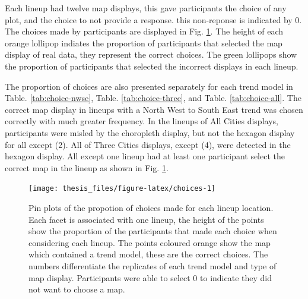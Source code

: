 \documentclass{monashthesis}
\begin{document}
Each lineup had twelve map displays, this gave participants the choice of any plot, and the choice to not provide a response. this non-reponse is indicated by 0.
The choices made by participants are displayed in Fig. \ref{fig:choices}. The height of each orange lollipop indiates the proportion of participants that selected the map display of real data, they represent the correct choices.
The green lollipops show the proportion of participants that selected the incorrect displays in each lineup.

The proportion of choices are also presented separately for each trend model in Table. \ref{tab:choice-nwse}, Table. \ref{tab:choice-three}, and Table. \ref{tab:choice-all}.
The correct map display in lineups with a North West to South East trend was chosen correctly with much greater frequency.
In the lineups of All Cities displays, participants were misled by the choropleth display, but not the hexagon display for all except (2).
All of Three Cities displays, except (4), were detected in the hexagon display. All except one lineup had at least one participant select the correct map in the lineup as shown in Fig. \ref{fig:choices}.

\begin{figure}

{\centering \texttt{[image: thesis\_files/figure-latex/choices-1]} 

}

\caption{Pin plots of the propotion of choices made for each lineup location. Each facet is associated with one lineup, the height of the points show the proportion of the participants that made each choice when considering each lineup. The points coloured orange show the map which contained a trend model, these are the correct choices. The numbers differentiate the replicates of each trend model and type of map display. Participants were able to select 0 to indicate they did not want to choose a map.}\label{fig:choices}
\end{figure}
\end{document}
